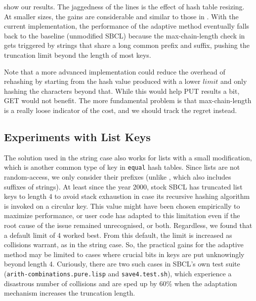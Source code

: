 \documentclass[sigconf]{acmart}
\newcommand*\lisp[1]{\texttt{#1}}
\renewcommand{\label}[1]{%
    \gdef\sfname{sf:##1}}%
\begin{document}
 show our results.
The jaggedness of the lines is the effect of hash table resizing.
At smaller sizes, the gains are considerable and similar to those in \citet{hentschel2022entropy}.
With the current implementation, the performance of the adaptive method eventually falls back to the baseline (unmodified SBCL) because the max-chain-length check in  gets triggered by strings that share a long common prefix and suffix, pushing the truncation limit beyond the length of most keys.

Note that a more advanced implementation could reduce the overhead of rehashing by starting  from the hash value produced with a lower $limit$ and only hashing the characters beyond that.
While this would help PUT results a bit, GET would not benefit.
The more fundamental problem is that max-chain-length is a really loose indicator of the cost, and we should track the regret instead.

\subsection{Experiments with List Keys}
\label{sec:experiments-with-list-keys}

The solution used in the string case also works for lists with a small modification, which is another common type of key in \lisp{equal} hash tables.
Since lists are not random-access, we only consider their prefixes (unlike , which also includes suffixes of strings).
At least since the year 2000, stock SBCL has truncated list keys to length 4 to avoid stack exhaustion in case its recursive hashing algorithm is invoked on a circular key.
This value might have been chosen empirically to maximize performance, or user code has adapted to this limitation even if the root cause of the issue remained unrecognised, or both.
Regardless, we found that a default limit of 4 worked best.
From this default, the limit is increased as collisions warrant, as in the string case.
So, the practical gains for the adaptive method may be limited to cases where crucial bits in keys are put unknowingly beyond length 4.
Curiously, there are two such cases in SBCL's own test suite (\texttt{\small arith-combinations.pure.lisp} and \texttt{\small save4.test.sh}), which experience a disastrous number of collisions and are sped up by 60\% when the adaptation mechanism increases the truncation length.
\end{document}
